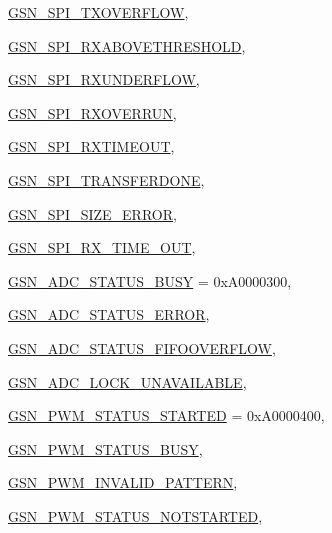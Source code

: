 \begin{DoxyCompactItemize}
\par
\hyperlink{a00659_gga476ae1caf992f8287176b2cc414c8707a4c586d25e7256e9978e4325cac4e6b18}{GSN\_\-SPI\_\-TXOVERFLOW}, 
\par
\hyperlink{a00659_gga476ae1caf992f8287176b2cc414c8707a2a61e951b8d398c0173fc0343088355f}{GSN\_\-SPI\_\-RXABOVETHRESHOLD}, 
\par
\hyperlink{a00659_gga476ae1caf992f8287176b2cc414c8707a799df9c083791f31fc9f02982bcc15ec}{GSN\_\-SPI\_\-RXUNDERFLOW}, 
\par
\hyperlink{a00659_gga476ae1caf992f8287176b2cc414c8707ad0e88b53b9168c4576474042be20f541}{GSN\_\-SPI\_\-RXOVERRUN}, 
\par
\hyperlink{a00659_gga476ae1caf992f8287176b2cc414c8707a41b807a10317c36700991f8d1fed4c6a}{GSN\_\-SPI\_\-RXTIMEOUT}, 
\par
\hyperlink{a00659_gga476ae1caf992f8287176b2cc414c8707a21486332ecdcecbbbcc57fdb5342dad3}{GSN\_\-SPI\_\-TRANSFERDONE}, 
\par
\hyperlink{a00659_gga476ae1caf992f8287176b2cc414c8707a4da8fc3c4d065325cada3810776a38ef}{GSN\_\-SPI\_\-SIZE\_\-ERROR}, 
\par
\hyperlink{a00659_gga476ae1caf992f8287176b2cc414c8707aedc36b7e3779184cb5d5a15e60739c7b}{GSN\_\-SPI\_\-RX\_\-TIME\_\-OUT}, 
\par
\hyperlink{a00659_gga476ae1caf992f8287176b2cc414c8707aea3bb908643b0bd4618bb808fe4dc8ff}{GSN\_\-ADC\_\-STATUS\_\-BUSY} =  0xA0000300, 
\par
\hyperlink{a00659_gga476ae1caf992f8287176b2cc414c8707afd368d701e428c449255a9462f8aa2d3}{GSN\_\-ADC\_\-STATUS\_\-ERROR}, 
\par
\hyperlink{a00659_gga476ae1caf992f8287176b2cc414c8707a3451755dbd5ce7fc3191b09b80a79ae4}{GSN\_\-ADC\_\-STATUS\_\-FIFOOVERFLOW}, 
\par
\hyperlink{a00659_gga476ae1caf992f8287176b2cc414c8707a4010bdec33fcbc86932406ee6bc688bf}{GSN\_\-ADC\_\-LOCK\_\-UNAVAILABLE}, 
\par
\hyperlink{a00659_gga476ae1caf992f8287176b2cc414c8707ab8779ad9899ef8da7a52e7d695004592}{GSN\_\-PWM\_\-STATUS\_\-STARTED} =  0xA0000400, 
\par
\hyperlink{a00659_gga476ae1caf992f8287176b2cc414c8707ae48f6d7ea6dec76e87a1125db12c1787}{GSN\_\-PWM\_\-STATUS\_\-BUSY}, 
\par
\hyperlink{a00659_gga476ae1caf992f8287176b2cc414c8707a5aa4c16091395243516364657aff2fe9}{GSN\_\-PWM\_\-INVALID\_\-PATTERN}, 
\par
\hyperlink{a00659_gga476ae1caf992f8287176b2cc414c8707a95a7a7b5c092515d04c24c6388e9905c}{GSN\_\-PWM\_\-STATUS\_\-NOTSTARTED}, 

\end{DoxyCompactItemize}
